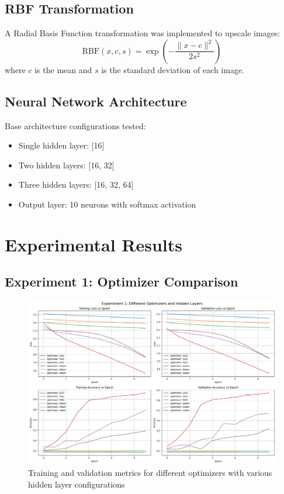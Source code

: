 \documentclass[11pt,a4paper]{article}
\begin{document}
\subsection{RBF Transformation}
A Radial Basis Function transformation was implemented to upscale images:
\[
\text{RBF}(x, c, s) = \exp\left(-\frac{\|x - c\|^2}{2s^2}\right)
\]
where $c$ is the mean and $s$ is the standard deviation of each image.

\subsection{Neural Network Architecture}
Base architecture configurations tested:
\begin{itemize}
    \item Single hidden layer: [16]
    \item Two hidden layers: [16, 32]
    \item Three hidden layers: [16, 32, 64]
    \item Output layer: 10 neurons with softmax activation
\end{itemize}

\section{Experimental Results}

\subsection{Experiment 1: Optimizer Comparison}
\begin{figure}[H]
\centering
\includegraphics[width=\textwidth]{e1.png}
\caption{Training and validation metrics for different optimizers with various hidden layer configurations}
\label{fig:experiment1}
\end{figure}
\end{document}
